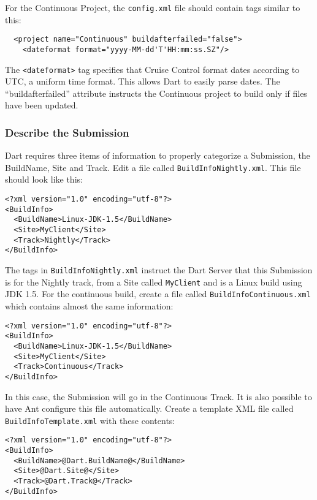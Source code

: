 \documentclass{InsightBook}
\newcommand{\xmltag}[1]{\texttt{<#1>}}
\newcommand{\filename}[1]{\texttt{#1}}
\begin{document}
For the Continuous Project, the \filename{config.xml} file should contain
tags similar to this:
\begin{verbatim}
  <project name="Continuous" buildafterfailed="false">
    <dateformat format="yyyy-MM-dd'T'HH:mm:ss.SZ"/>
\end{verbatim}
The \xmltag{dateformat} tag specifies that Cruise Control format
dates according to UTC, a uniform time format.  This allows Dart to
easily parse dates.  The ``buildafterfailed'' attribute instructs the
Continuous project to build only if files have been updated.

\subsubsection{Describe the Submission}
Dart requires three items of information to properly categorize a
Submission, the BuildName, Site and Track.  Edit a file called
\filename{BuildInfoNightly.xml}.  This file should look like this:
\begin{verbatim}
<?xml version="1.0" encoding="utf-8"?>
<BuildInfo>
  <BuildName>Linux-JDK-1.5</BuildName>
  <Site>MyClient</Site>
  <Track>Nightly</Track>
</BuildInfo>
\end{verbatim}

The tags in \filename{BuildInfoNightly.xml} instruct the Dart Server that this
Submission is for the Nightly track, from a Site called
\texttt{MyClient} and is a Linux build using JDK 1.5.  For the
continuous build, create a file called \filename{BuildInfoContinuous.xml} which
contains almost the same information:
\begin{verbatim}
<?xml version="1.0" encoding="utf-8"?>
<BuildInfo>
  <BuildName>Linux-JDK-1.5</BuildName>
  <Site>MyClient</Site>
  <Track>Continuous</Track>
</BuildInfo>
\end{verbatim}

In this case, the Submission will go in the Continuous Track.  It is
also possible to have Ant configure this file automatically.  Create a
template XML file called \filename{BuildInfoTemplate.xml} with these
contents:
\begin{verbatim}
<?xml version="1.0" encoding="utf-8"?>
<BuildInfo>
  <BuildName>@Dart.BuildName@</BuildName>
  <Site>@Dart.Site@</Site>
  <Track>@Dart.Track@</Track>
</BuildInfo>
\end{verbatim}
\end{document}
